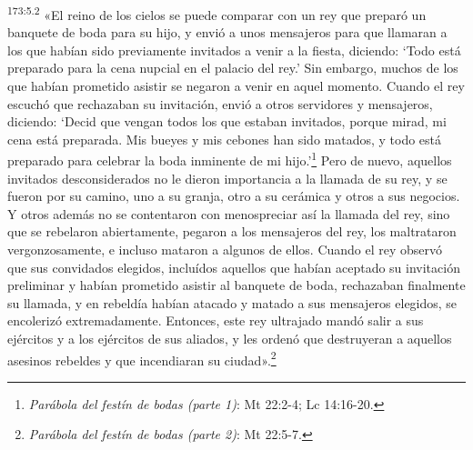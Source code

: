 \par 
\textsuperscript{173:5.2} «El reino de los cielos se puede comparar con un rey que preparó un banquete de boda para su hijo, y envió a unos mensajeros para que llamaran a los que habían sido previamente invitados a venir a la fiesta, diciendo: `Todo está preparado para la cena nupcial en el palacio del rey.' Sin embargo, muchos de los que habían prometido asistir se negaron a venir en aquel momento. Cuando el rey escuchó que rechazaban su invitación, envió a otros servidores y mensajeros, diciendo: `Decid que vengan todos los que estaban invitados, porque mirad, mi cena está preparada. Mis bueyes y mis cebones han sido matados, y todo está preparado para celebrar la boda inminente de mi hijo.'\footnote{\textit{Parábola del festín de bodas (parte 1)}: Mt 22:2-4; Lc 14:16-20.} Pero de nuevo, aquellos invitados desconsiderados no le dieron importancia a la llamada de su rey, y se fueron por su camino, uno a su granja, otro a su cerámica y otros a sus negocios. Y otros además no se contentaron con menospreciar así la llamada del rey, sino que se rebelaron abiertamente, pegaron a los mensajeros del rey, los maltrataron vergonzosamente, e incluso mataron a algunos de ellos. Cuando el rey observó que sus convidados elegidos, incluídos aquellos que habían aceptado su invitación preliminar y habían prometido asistir al banquete de boda, rechazaban finalmente su llamada, y en rebeldía habían atacado y matado a sus mensajeros elegidos, se encolerizó extremadamente. Entonces, este rey ultrajado mandó salir a sus ejércitos y a los ejércitos de sus aliados, y les ordenó que destruyeran a aquellos asesinos rebeldes y que incendiaran su ciudad».\footnote{\textit{Parábola del festín de bodas (parte 2)}: Mt 22:5-7.}

